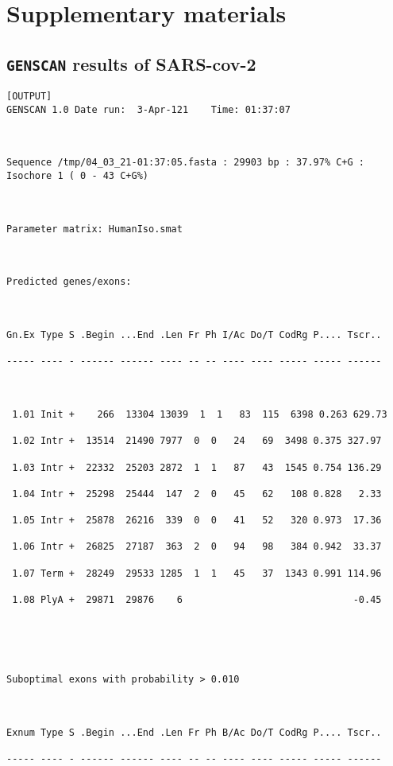 \documentclass[en,black,10pt,normal]{elegantnote}
\begin{document}
\section{Supplementary materials}
\subsection{\texttt{GENSCAN} results of SARS-cov-2}
\begin{lstlisting}[frame=single]
[OUTPUT]
GENSCAN 1.0	Date run:  3-Apr-121	Time: 01:37:07



Sequence /tmp/04_03_21-01:37:05.fasta : 29903 bp : 37.97% C+G : Isochore 1 ( 0 - 43 C+G%)



Parameter matrix: HumanIso.smat



Predicted genes/exons:



Gn.Ex Type S .Begin ...End .Len Fr Ph I/Ac Do/T CodRg P.... Tscr..

----- ---- - ------ ------ ---- -- -- ---- ---- ----- ----- ------



 1.01 Init +    266  13304 13039  1  1   83  115  6398 0.263 629.73

 1.02 Intr +  13514  21490 7977  0  0   24   69  3498 0.375 327.97

 1.03 Intr +  22332  25203 2872  1  1   87   43  1545 0.754 136.29

 1.04 Intr +  25298  25444  147  2  0   45   62   108 0.828   2.33

 1.05 Intr +  25878  26216  339  0  0   41   52   320 0.973  17.36

 1.06 Intr +  26825  27187  363  2  0   94   98   384 0.942  33.37

 1.07 Term +  28249  29533 1285  1  1   45   37  1343 0.991 114.96

 1.08 PlyA +  29871  29876    6                              -0.45





Suboptimal exons with probability > 0.010



Exnum Type S .Begin ...End .Len Fr Ph B/Ac Do/T CodRg P.... Tscr..

----- ---- - ------ ------ ---- -- -- ---- ---- ----- ----- ------




\end{lstlisting}
\end{document}
